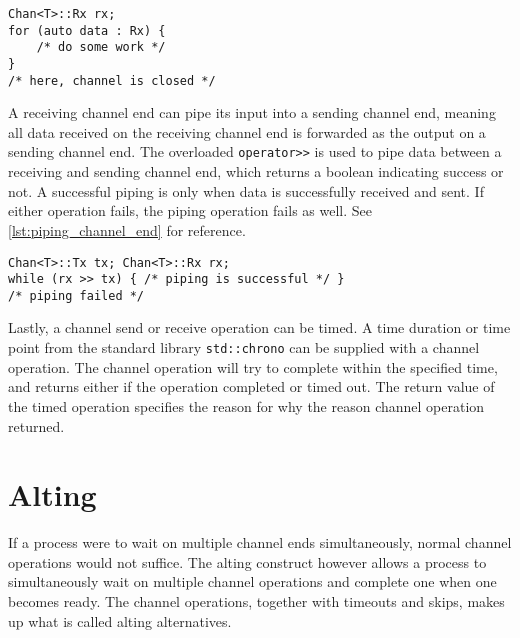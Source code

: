 \begin{lstfloat}
\begin{lstlisting}[caption={Range\hyp{}based for loops with the receving channel end.}, label={lst:range_based_for_loops_channel}, style={CustomC++}, xleftmargin={2em}]
Chan<T>::Rx rx;
for (auto data : Rx) {
    /* do some work */
}
/* here, channel is closed */
\end{lstlisting}
\end{lstfloat}

A receiving channel end can pipe its input into a sending channel end, meaning all data received on the receiving channel end is forwarded as the output on a sending channel end. The overloaded \lstinline[style={CustomC++}]|operator>>| is used to pipe data between a receiving and sending channel end, which returns a boolean indicating success or not. A successful piping is only when data is successfully received and sent. If either operation fails, the piping operation fails as well. See \cref{lst:piping_channel_end} for reference.


\begin{lstfloat}
\begin{lstlisting}[caption={Piping from a receiving to sending channel end object.}, label={lst:piping_channel_end}, style={CustomC++}, xleftmargin={2em}]
Chan<T>::Tx tx; Chan<T>::Rx rx;
while (rx >> tx) { /* piping is successful */ }
/* piping failed */
\end{lstlisting}
\end{lstfloat}

Lastly, a channel send or receive operation can be timed. A time duration or time point from the standard library \lstinline[style={CustomC++}]|std::chrono| can be supplied with a channel operation. The channel operation will try to complete within the specified time, and returns either if the operation completed or timed out. The return value of the timed operation specifies the reason for why the reason channel operation returned.


\section{Alting}


If a process were to wait on multiple channel ends simultaneously, normal channel operations would not suffice. The alting construct however allows a process to simultaneously wait on multiple channel operations and complete one when one becomes ready. The channel operations, together with timeouts and skips, makes up what is called alting alternatives.

